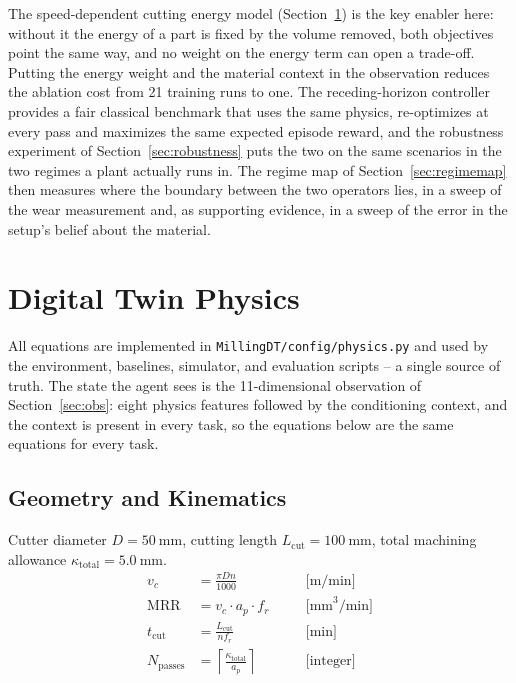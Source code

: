 \documentclass[11pt,a4paper]{article}
\newcommand{\MRR}{\mathrm{MRR}}
\begin{document}
The speed-dependent cutting energy model (Section~\ref{sec:physics}) is the key enabler here: without it the energy of a part is fixed by the volume removed, both objectives point the same way, and no weight on the energy term can open a trade-off. Putting the energy weight and the material context in the observation reduces the ablation cost from 21 training runs to one. The receding-horizon controller provides a fair classical benchmark that uses the same physics, re-optimizes at every pass and maximizes the same expected episode reward, and the robustness experiment of Section~\ref{sec:robustness} puts the two on the same scenarios in the two regimes a plant actually runs in. The regime map of Section~\ref{sec:regimemap} then measures where the boundary between the two operators lies, in a sweep of the wear measurement and, as supporting evidence, in a sweep of the error in the setup's belief about the material.

\section{Digital Twin Physics}
\label{sec:physics}

All equations are implemented in \texttt{MillingDT/config/physics.py} and used by the environment, baselines, simulator, and evaluation scripts -- a single source of truth. The state the agent sees is the 11-dimensional observation of Section~\ref{sec:obs}: eight physics features followed by the conditioning context, and the context is present in every task, so the equations below are the same equations for every task.

\subsection{Geometry and Kinematics}
Cutter diameter $D = 50\ \text{mm}$, cutting length $L_\text{cut} = 100\ \text{mm}$, total machining allowance $\kappa_\text{total} = 5.0\ \text{mm}$.
\begin{align}
    v_c &= \frac{\pi D n}{1000} \quad &&\text{[m/min]} \label{eq:vc} \\
    \MRR &= v_c \cdot a_p \cdot f_r \quad &&\text{[mm}^3/\text{min]} \label{eq:mrr} \\
    t_\text{cut} &= \frac{L_\text{cut}}{n f_r} \quad &&\text{[min]} \label{eq:tcut} \\
    N_\text{passes} &= \left\lceil \frac{\kappa_\text{total}}{a_p} \right\rceil \quad &&\text{[integer]} \label{eq:npasses}
\end{align}
\end{document}
